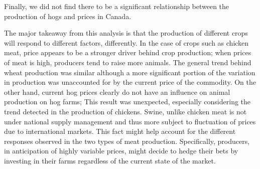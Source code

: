 Finally, we did not find there to be a significant relationship between the production of hogs and prices in Canada.


The major takeaway from this analysis is that the production of different crops will respond to different factors, differently.
In the case of crops such as chicken meat, price appears to be a stronger driver behind crop production; when prices of meat is high, producers tend to raise more animals.
The general trend behind wheat production was similar although a more significant portion of the variation in production was unaccounted for by the current price of the commodity.
On the other hand, current hog prices clearly do not have an influence on animal production on hog farms;
This result was unexpected, especially considering the trend detected in the production of chickens.
Swine, unlike chicken meat is not under national supply management and thus more subject to fluctuation of prices due to international markets.
This fact might help account for the different responses observed in the two types of meat production.
Specifically, producers, in anticipation of highly variable prices, might decide to hedge their bets by investing in their farms regardless of the current state of the market.
